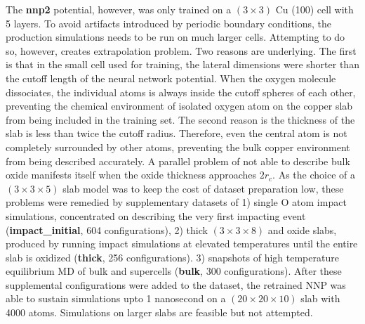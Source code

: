 \message{ !name(paper.tex)}\documentclass[manuscript=cmatex]{achemso}
\begin{document}
The \textbf{nnp2} potential, however, was only trained on a $(3\times3)$ Cu (100) cell with 5 layers. To avoid artifacts introduced by periodic boundary conditions, the production simulations needs to be run on much larger cells. Attempting to do so, however, creates extrapolation problem. Two reasons are underlying. The first is that in the small cell used for training, the lateral dimensions were shorter than the cutoff length of the neural network potential. When the oxygen molecule dissociates, the individual atoms is always inside the cutoff spheres of each other, preventing the chemical environment of isolated oxygen atom on the copper slab from being included in the training set. The second reason is the thickness of the slab is less than twice the cutoff radius. Therefore, even the central  atom is not completely surrounded by other  atoms, preventing the bulk copper environment from being described accurately. A parallel problem of not able to describe bulk oxide manifests itself when the oxide thickness approaches $2r_c$. As the choice of a $(3\times3\times5)$ slab model was to keep the cost of dataset preparation low, these problems were remedied by supplementary datasets of 1) single O atom impact simulations, concentrated on describing the very first impacting event (\textbf{impact\_initial}, 604 configurations), 2) thick $(3\times3\times8)$  and oxide slabs, produced by running impact simulations at elevated temperatures until the entire slab is oxidized (\textbf{thick}, 256 configurations). 3) snapshots of high temperature equilibrium MD of bulk  and  supercells (\textbf{bulk}, 300 configurations). After these supplemental configurations were added to the dataset, the retrained NNP was able to sustain simulations upto 1 nanosecond on a $(20\times20\times10)$ slab with 4000 atoms. Simulations on larger slabs are feasible but not attempted.
\end{document}
